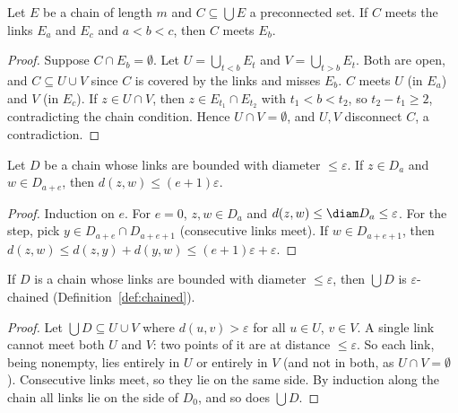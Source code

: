 \begin{lemma}\label{lem:between-link}
Let $E$ be a chain of length $m$ and $C\subseteq\bigcup E$ a preconnected set. If $C$ meets
the links $E_a$ and $E_c$ and $a<b<c$, then $C$ meets $E_b$.
\end{lemma}

\begin{proof}
Suppose $C\cap E_b=\emptyset$. Let $U=\bigcup_{t<b}E_t$ and $V=\bigcup_{t>b}E_t$. Both are open,
and $C\subseteq U\cup V$ since $C$ is covered by the links and misses $E_b$. $C$ meets $U$
(in $E_a$) and $V$ (in $E_c$). If $z\in U\cap V$, then $z\in E_{t_1}\cap E_{t_2}$ with
$t_1<b<t_2$, so $t_2-t_1\ge2$, contradicting the chain condition. Hence $U\cap V=\emptyset$, and
$U,V$ disconnect $C$, a contradiction.
\end{proof}


\begin{lemma}\label{lem:dist-along}
Let $D$ be a chain whose links are bounded with diameter $\le\varepsilon$. If $z\in D_a$ and
$w\in D_{a+e}$, then $d(z,w)\le(e+1)\varepsilon$.
\end{lemma}

\begin{proof}
Induction on $e$. For $e=0$, $z,w\in D_a$ and $d(z,w)\le\diam D_a\le\varepsilon$. For the step,
pick $y\in D_{a+e}\cap D_{a+e+1}$ (consecutive links meet). If $w\in D_{a+e+1}$, then
$d(z,w)\le d(z,y)+d(y,w)\le(e+1)\varepsilon+\varepsilon$.
\end{proof}


\begin{lemma}\label{lem:union-chained}
If $D$ is a chain whose links are bounded with diameter $\le\varepsilon$, then $\bigcup D$ is
$\varepsilon$-chained (Definition~\ref{def:chained}).
\end{lemma}

\begin{proof}
Let $\bigcup D\subseteq U\cup V$ where $d(u,v)>\varepsilon$ for all $u\in U$, $v\in V$. A single
link cannot meet both $U$ and $V$: two points of it are at distance $\le\varepsilon$. So each
link, being nonempty, lies entirely in $U$ or entirely in $V$ (and not in both, as $U\cap
V=\emptyset$). Consecutive links meet, so they lie on the same side. By induction along the
chain all links lie on the side of $D_0$, and so does $\bigcup D$.
\end{proof}

